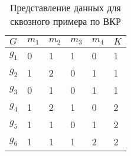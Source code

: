 \begin{table} [htbp]%
	\centering\small
	\caption{Представление данных для сквозного примера по ВКР \cite{Peskov2004}}%
	\label{tab:ToyCompare-app}
	\begin{tabular}{|l|l|l|l|l|l|}
		\hline
		$G$&$m_1$&$m_2$&$m_3$&$m_4$&$K$\\
		\hline
		$g_1$&0&1&1&0&1\\ \hline
		$g_2$&1&2&0&1&1\\ \hline
		$g_3$&0&1&0&1&1\\ \hline
		$g_4$&1&2&1&0&2\\ \hline
		$g_5$&1&1&0&1&2\\ \hline
		$g_6$&1&1&1&2&2\\ \hline
	\end{tabular}
	\normalsize%
\end{table}

